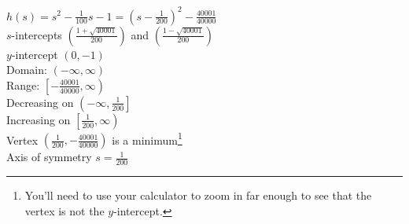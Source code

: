 \documentclass{ximera}
\begin{document}
\begin{question}
\begin{problem}
\begin{solution}
    $h(s) = s^{2} - \frac{1}{100} s - 1 = \left(s - \frac{1}{200}\right)^{2} - \frac{40001}{40000}$\\
$s$-intercepts $\left(\frac{1 + \sqrt{40001}}{200}\right)$ and $\left(\frac{1 - \sqrt{40001}}{200}\right)$\\
$y$-intercept $(0, -1)$\\
Domain: $(-\infty, \infty)$ \\
Range: $\left[-\frac{40001}{40000}, \infty \right)$ \\
Decreasing on $\left(-\infty, \frac{1}{200}\right]$ \\
Increasing on $\left[\frac{1}{200}, \infty \right)$ \\
Vertex $\left(\frac{1}{200}, -\frac{40001}{40000}\right)$ is a minimum\footnote{You'll need to use your calculator to zoom in far enough to see that the vertex is not the $y$-intercept.} \\
Axis of symmetry $s = \frac{1}{200}$ \\
\end{solution}
\end{problem}
\end{question}
\end{document}
